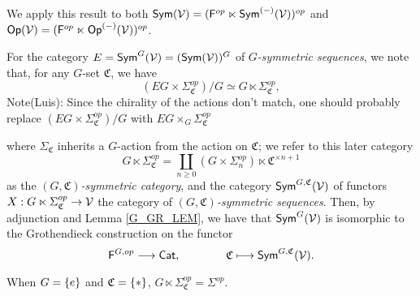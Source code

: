 \documentclass[a4paper,10pt
,draft
]{article}%
\renewcommand{\1}{\eta}%
\begin{document}

We apply this result to both $\mathsf{Sym}(\mathcal V) = (\mathsf F^{op} \ltimes \mathsf{Sym}^{(-)}(\mathcal V))^{op}$ and $\mathsf{Op}(\mathcal V) = (\mathsf F^{op} \ltimes \mathsf{Op}^{(-)}(\mathcal V))^{op}$.

\begin{definition}
      For the category $E = \mathsf{Sym}^G(\mathcal V) = (\mathsf{Sym}(\mathcal V))^G$ of \textit{$G$-symmetric sequences},
      we note that, for any $G$-set $\mathfrak C$, we have
      \begin{equation}
            (E G \times \Sigma_{\mathfrak C}^{op})/G \simeq G \ltimes \Sigma_{\mathfrak C}^{op},
      \end{equation}
{\color{red} Note(Luis): Since the chirality of the actions don't match, one should probably replace 
$(E G \times \Sigma_{\mathfrak C}^{op})/G$ with
$E G \times_G \Sigma_{\mathfrak C}^{op}$ 
}

      where $\Sigma_{\mathfrak C}$ inherits a $G$-action from the action on $\mathfrak C$;
      we refer to this later category
      \begin{equation}
            G \ltimes \Sigma_{\mathfrak C}^{op} = \coprod_{n \geq 0}(G \times \Sigma_n^{op}) \ltimes \mathfrak C^{\times n+1}
      \end{equation}
      as the \textit{$(G, \mathfrak C)$-symmetric category},
      and the category $\mathsf{Sym}^{G, \mathfrak C}(\mathcal V)$ of functors $X: G \ltimes \Sigma_{\mathfrak C} ^{op}\to \mathcal V$
      the category of \textit{$(G, \mathfrak C)$-symmetric sequences}.
      Then, by adjunction and Lemma \ref{G_GR_LEM}, we have that
      $\mathsf{Sym}^G(\mathcal V)$ is isomorphic to the Grothendieck construction on the functor
      \begin{equation}
            \mathsf F^{G,op} \longrightarrow \mathsf{Cat},
            \qquad
            \qquad
            \mathfrak C \longmapsto \mathsf{Sym}^{G, \mathfrak C}(\mathcal V).
      \end{equation}
\end{definition}

\begin{remark}
      When $G = \left\{e\right\}$ and $\mathfrak C = \left\{*\right\}$, $G \ltimes \Sigma_{\mathfrak C}^{op} = \Sigma^{op}$.
\end{remark}
\end{document}
